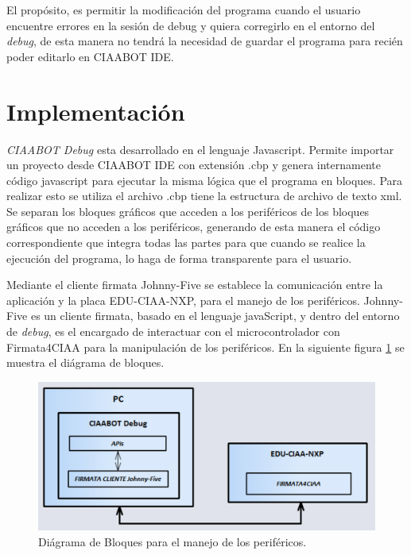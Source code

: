 El propósito, es permitir la modificación del programa cuando el usuario encuentre errores en la sesión de debug y quiera corregirlo en el entorno del \emph{debug}, de esta manera no tendrá la necesidad de guardar el programa para recién poder editarlo en CIAABOT IDE.


\section{Implementación}
\label{sec:Implementación}

\emph{CIAABOT Debug} esta desarrollado en el lenguaje Javascript. Permite importar un proyecto desde CIAABOT IDE con extensión .cbp y genera internamente código javascript para ejecutar la misma lógica que el programa en bloques. 
Para realizar esto se utiliza el archivo .cbp tiene la estructura de archivo de texto xml. Se separan los bloques gráficos que acceden a los periféricos de los bloques gráficos que no acceden a los periféricos, generando de esta manera el código correspondiente que integra todas las partes para que cuando se realice la ejecución del programa, lo haga de forma transparente para el usuario.

Mediante el cliente firmata Johnny-Five se establece la comunicación entre la aplicación y la placa EDU-CIAA-NXP, para el manejo de los periféricos. Johnny-Five es un cliente firmata, basado en el lenguaje javaScript, y dentro del entorno de \emph{debug}, es el encargado de interactuar con el microcontrolador con Firmata4CIAA para la manipulación de los periféricos.
En la siguiente figura \ref{fig:diagrama-bloques} se muestra el diágrama de bloques.

\begin{figure}[!htbp]
	\centering
	\includegraphics*[width=13cm]{./Figures/diagrama-bloques-2.PNG}
	\caption{Diágrama de Bloques para el manejo de los periféricos.}
	\par\label{fig:diagrama-bloques}
\end{figure}

